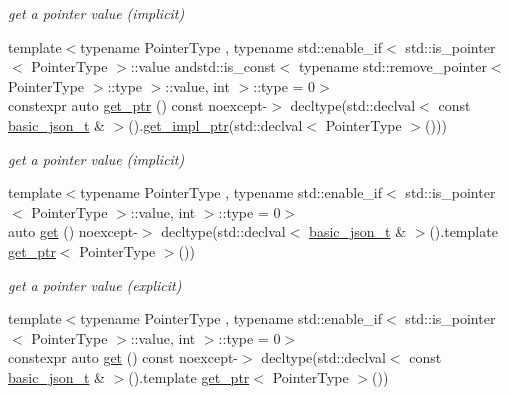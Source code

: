 \begin{DoxyCompactItemize}
\begin{DoxyCompactList}\small\item\em get a pointer value (implicit) \end{DoxyCompactList}\item 
{\footnotesize template$<$typename Pointer\+Type , typename std\+::enable\+\_\+if$<$ std\+::is\+\_\+pointer$<$ Pointer\+Type $>$\+::value andstd\+::is\+\_\+const$<$ typename std\+::remove\+\_\+pointer$<$ Pointer\+Type $>$\+::type $>$\+::value, int $>$\+::type  = 0$>$ }\\constexpr auto \hyperlink{classnlohmann_1_1basic__json_a5a291f4cfe655c1a5f893e5ea49338a9}{get\+\_\+ptr} () const noexcept-\/$>$ decltype(std\+::declval$<$ const \hyperlink{classnlohmann_1_1basic__json_afff7860310ae69f29f8158a77ec0ef13}{basic\+\_\+json\+\_\+t} \& $>$().\hyperlink{classnlohmann_1_1basic__json_a58b65f595883fb93333423ec5e3bafee}{get\+\_\+impl\+\_\+ptr}(std\+::declval$<$ Pointer\+Type $>$()))
\begin{DoxyCompactList}\small\item\em get a pointer value (implicit) \end{DoxyCompactList}\item 
{\footnotesize template$<$typename Pointer\+Type , typename std\+::enable\+\_\+if$<$ std\+::is\+\_\+pointer$<$ Pointer\+Type $>$\+::value, int $>$\+::type  = 0$>$ }\\auto \hyperlink{classnlohmann_1_1basic__json_ab343193a445b974e36ceb6330b5d3705}{get} () noexcept-\/$>$ decltype(std\+::declval$<$ \hyperlink{classnlohmann_1_1basic__json_afff7860310ae69f29f8158a77ec0ef13}{basic\+\_\+json\+\_\+t} \& $>$().template \hyperlink{classnlohmann_1_1basic__json_aa263420f5d1e68b05d25a83a457725a0}{get\+\_\+ptr}$<$ Pointer\+Type $>$())
\begin{DoxyCompactList}\small\item\em get a pointer value (explicit) \end{DoxyCompactList}\item 
{\footnotesize template$<$typename Pointer\+Type , typename std\+::enable\+\_\+if$<$ std\+::is\+\_\+pointer$<$ Pointer\+Type $>$\+::value, int $>$\+::type  = 0$>$ }\\constexpr auto \hyperlink{classnlohmann_1_1basic__json_a218eaccdcf7eef52a160161efc29feb2}{get} () const noexcept-\/$>$ decltype(std\+::declval$<$ const \hyperlink{classnlohmann_1_1basic__json_afff7860310ae69f29f8158a77ec0ef13}{basic\+\_\+json\+\_\+t} \& $>$().template \hyperlink{classnlohmann_1_1basic__json_aa263420f5d1e68b05d25a83a457725a0}{get\+\_\+ptr}$<$ Pointer\+Type $>$())

\end{DoxyCompactItemize}
